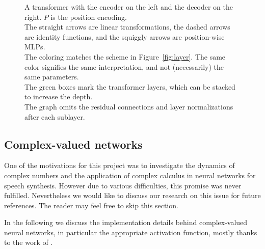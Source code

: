 \documentclass[11pt]{article}
\begin{document}
\begin{figure}
  \centering
  \caption[]{\label{fig:transformer}A transformer
    with the encoder on the left and the decoder on the right.
    \(P\) is the position encoding.\\
    The straight arrows are linear transformations,
    the dashed arrows are identity functions,
    and the squiggly arrows are position-wise MLPs.\\
    The coloring matches the scheme in Figure~\ref{fig:layer}.
    The same color signifies the same interpretation,
    and not (necessarily) the same parameters.\\
    The green boxes mark the transformer layers,
    which can be stacked to increase the depth.\\
    The graph omits the residual connections and layer normalizations after each sublayer.}
\end{figure}

\subsection{Complex-valued networks}

One of the motivations for this project was to investigate the dynamics of complex numbers
and the application of complex calculus in neural networks for speech synthesis.
However due to various difficulties, this promise was never fulfilled.
Nevertheless we would like to discuss our research on this issue for future references.
The reader may feel free to skip this section.

In the following we discuss the implementation details behind complex-valued neural networks,
in particular the appropriate activation function, mostly thanks to the work of \textcite{scardapane2018complex}.
\end{document}
